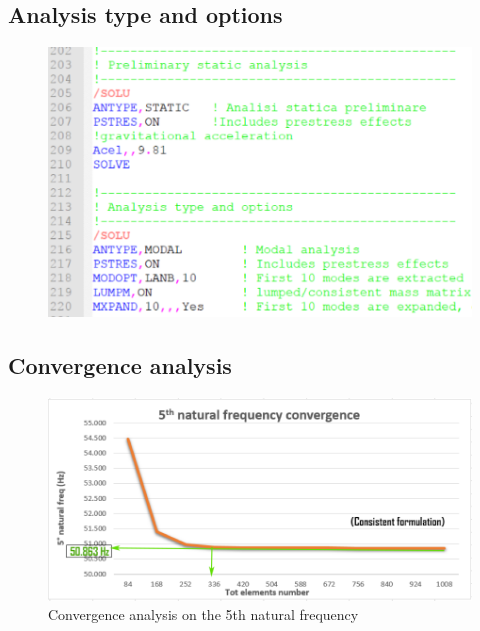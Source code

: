 \clearpage
\subsection*{Analysis type and options}
\noindent
\begin{figure}[h]
	\begin{center}
		\centering  		 		
		\includegraphics[width=0.9\linewidth]{PICTURES/2_Lama_truss/PNG/antype2.png}
	\end{center}
\end{figure}


\subsection*{Convergence analysis}
\noindent
\begin{figure}[h]
	\begin{center}
		\centering  		 		
		\includegraphics[width=0.8\linewidth]{PICTURES/2_Lama_truss/PNG/cov.png}
	\end{center}
	\caption {Convergence analysis on the 5th natural frequency}
\end{figure}



